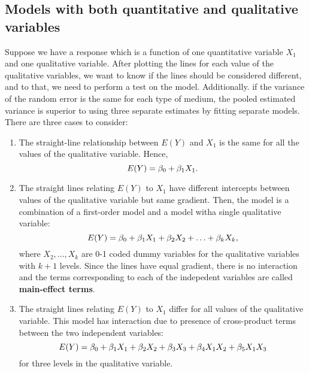 \documentclass{report}
\begin{document}
	\subsection{Models with both quantitative and qualitative variables}
	Suppose we have a response which is a function of one quantitative variable $X_1$ and one qualitative variable. After plotting the lines for each value of the qualitative variables, we want to know if the lines should be considered different, and to that, we need to perform a test on the model. Additionally. if the variance of the random error is the same for each type of medium, the pooled estimated variance is superior to using three separate estimates by fitting separate models. \\
	
	There are three cases to consider:
	\begin{enumerate}
		\item The straight-line relationship between $E(Y)$ and $X_1$ is the same for all the values of the qualitative variable. Hence,
		$$E(Y)=\beta_0+\beta_1X_1.$$
		\item The straight lines relating $E(Y)$ to $X_1$ have different intercepts between values of the qualitative variable but same gradient. Then, the model is a combination of a first-order model and a model witha single qualitative variable:
		$$E(Y)=\beta_0+\beta_1X_1+\beta_2X_2+\ldots+\beta_kX_k,$$
		where $X_2,\ldots,X_k$ are 0-1 coded dummy variables for the qualitative variables with $k+1$ levels. Since the lines have equal gradient, there is no interaction and the terms corresponding to each of the indepedent variables are called \textbf{main-effect terms}.
		\item The straight lines relating $E(Y)$ to $X_1$ differ for all values of the qualitative variable. This model has interaction due to presence of cross-product terms between the two independent variables:
		$$E(Y)=\beta_0+\beta_1X_1+\beta_2X_2+\beta_3X_3+\beta_4X_1X_2+\beta_5X_1X_3$$
		for three levels in the qualitative variable. 
	\end{enumerate}
	\vspace{2mm}
\end{document}
